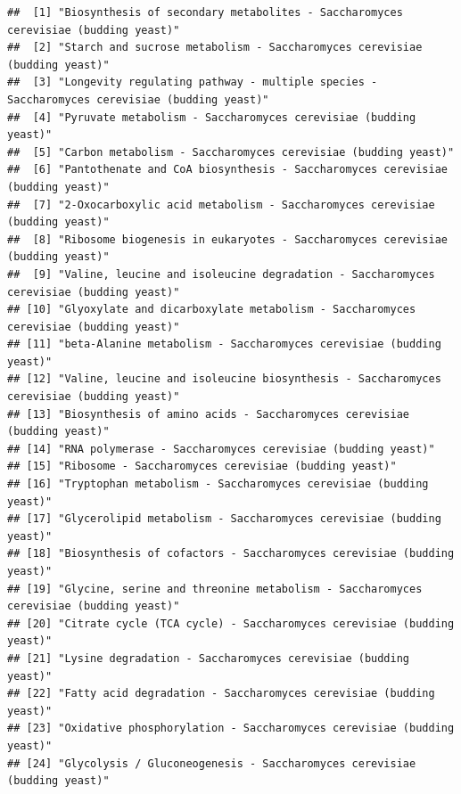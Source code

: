 \documentclass[
]{book}
\begin{document}
\begin{verbatim}
##  [1] "Biosynthesis of secondary metabolites - Saccharomyces cerevisiae (budding yeast)"                 
##  [2] "Starch and sucrose metabolism - Saccharomyces cerevisiae (budding yeast)"                         
##  [3] "Longevity regulating pathway - multiple species - Saccharomyces cerevisiae (budding yeast)"       
##  [4] "Pyruvate metabolism - Saccharomyces cerevisiae (budding yeast)"                                   
##  [5] "Carbon metabolism - Saccharomyces cerevisiae (budding yeast)"                                     
##  [6] "Pantothenate and CoA biosynthesis - Saccharomyces cerevisiae (budding yeast)"                     
##  [7] "2-Oxocarboxylic acid metabolism - Saccharomyces cerevisiae (budding yeast)"                       
##  [8] "Ribosome biogenesis in eukaryotes - Saccharomyces cerevisiae (budding yeast)"                     
##  [9] "Valine, leucine and isoleucine degradation - Saccharomyces cerevisiae (budding yeast)"            
## [10] "Glyoxylate and dicarboxylate metabolism - Saccharomyces cerevisiae (budding yeast)"               
## [11] "beta-Alanine metabolism - Saccharomyces cerevisiae (budding yeast)"                               
## [12] "Valine, leucine and isoleucine biosynthesis - Saccharomyces cerevisiae (budding yeast)"           
## [13] "Biosynthesis of amino acids - Saccharomyces cerevisiae (budding yeast)"                           
## [14] "RNA polymerase - Saccharomyces cerevisiae (budding yeast)"                                        
## [15] "Ribosome - Saccharomyces cerevisiae (budding yeast)"                                              
## [16] "Tryptophan metabolism - Saccharomyces cerevisiae (budding yeast)"                                 
## [17] "Glycerolipid metabolism - Saccharomyces cerevisiae (budding yeast)"                               
## [18] "Biosynthesis of cofactors - Saccharomyces cerevisiae (budding yeast)"                             
## [19] "Glycine, serine and threonine metabolism - Saccharomyces cerevisiae (budding yeast)"              
## [20] "Citrate cycle (TCA cycle) - Saccharomyces cerevisiae (budding yeast)"                             
## [21] "Lysine degradation - Saccharomyces cerevisiae (budding yeast)"                                    
## [22] "Fatty acid degradation - Saccharomyces cerevisiae (budding yeast)"                                
## [23] "Oxidative phosphorylation - Saccharomyces cerevisiae (budding yeast)"                             
## [24] "Glycolysis / Gluconeogenesis - Saccharomyces cerevisiae (budding yeast)"                          

\end{verbatim}
\end{document}
